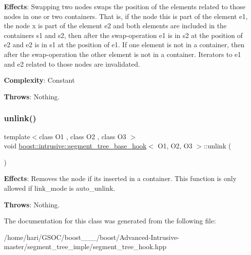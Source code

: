 {\bfseries Effects}\+: Swapping two nodes swaps the position of the elements related to those nodes in one or two containers. That is, if the node this is part of the element e1, the node x is part of the element e2 and both elements are included in the containers s1 and s2, then after the swap-\/operation e1 is in s2 at the position of e2 and e2 is in s1 at the position of e1. If one element is not in a container, then after the swap-\/operation the other element is not in a container. Iterators to e1 and e2 related to those nodes are invalidated.

{\bfseries Complexity}\+: Constant

{\bfseries Throws}\+: Nothing. \mbox{\label{classboost_1_1intrusive_1_1segment__tree__base__hook_a6858bb144c5c5f2e8ae256ac7a44b46d}} 
\subsubsection{\texorpdfstring{unlink()}{unlink()}}
{\footnotesize\ttfamily template$<$class O1 , class O2 , class O3 $>$ \\
void \hyperlink{classboost_1_1intrusive_1_1segment__tree__base__hook}{boost\+::intrusive\+::segment\+\_\+tree\+\_\+base\+\_\+hook}$<$ O1, O2, O3 $>$\+::unlink (\begin{DoxyParamCaption}{ }\end{DoxyParamCaption})}

{\bfseries Effects}\+: Removes the node if it\textquotesingle{}s inserted in a container. This function is only allowed if link\+\_\+mode is {\ttfamily auto\+\_\+unlink}.

{\bfseries Throws}\+: Nothing. 

The documentation for this class was generated from the following file\+:\begin{DoxyCompactItemize}
\item 
/home/hari/\+G\+S\+O\+C/boost\+\_\+\_\+\_/boost/\+Advanced-\/\+Intrusive-\/master/segment\+\_\+tree\+\_\+imple/segment\+\_\+tree\+\_\+hook.\+hpp\end{DoxyCompactItemize}
